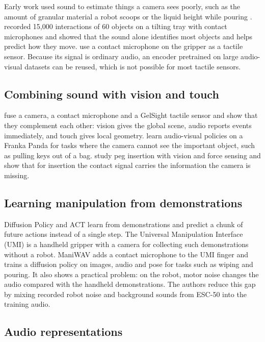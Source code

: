 \documentclass[
  english,
  accentcolor=11b,
  type=intern,
  marginpar=false,
  logofile=figures/PEARLTUDA.png
]{tudapub}
\begin{document}
Early work used sound to estimate things a camera sees poorly, such as the amount of granular material a robot scoops \citep{clarke2018granular} or the liquid height while pouring \citep{liang2019pouring}. \citet{gandhi2020swoosh} recorded 15,000 interactions of 60 objects on a tilting tray with contact microphones and showed that the sound alone identifies most objects and helps predict how they move. \citet{mejia2024hearing} use a contact microphone on the gripper as a tactile sensor. Because its signal is ordinary audio, an encoder pretrained on large audio-visual datasets can be reused, which is not possible for most tactile sensors.

\subsection{Combining sound with vision and touch}

\citet{li2022seehearfeel} fuse a camera, a contact microphone and a GelSight tactile sensor and show that they complement each other: vision gives the global scene, audio reports events immediately, and touch gives local geometry. \citet{du2022playbyear} learn audio-visual policies on a Franka Panda for tasks where the camera cannot see the important object, such as pulling keys out of a bag. \citet{lee2019visiontouch} study peg insertion with vision and force sensing and show that for insertion the contact signal carries the information the camera is missing.

\subsection{Learning manipulation from demonstrations}

Diffusion Policy \citep{chi2023diffusion} and ACT \citep{zhao2023act} learn from demonstrations and predict a chunk of future actions instead of a single step. The Universal Manipulation Interface (UMI) \citep{chi2024umi} is a handheld gripper with a camera for collecting such demonstrations without a robot. ManiWAV \citep{liu2024maniwav} adds a contact microphone to the UMI finger and trains a diffusion policy on images, audio and pose for tasks such as wiping and pouring. It also shows a practical problem: on the robot, motor noise changes the audio compared with the handheld demonstrations. The authors reduce this gap by mixing recorded robot noise and background sounds from ESC-50 \citep{piczak2015esc} into the training audio.

\subsection{Audio representations}
\end{document}
